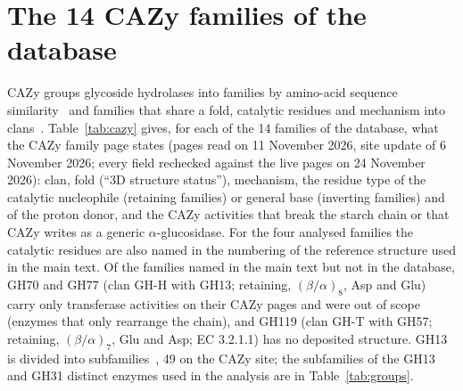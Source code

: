 \documentclass[preprint,12pt]{elsarticle}
\begin{document}
\section{The 14 CAZy families of the database}\label{sec:cazy}
CAZy groups glycoside hydrolases into families by amino-acid sequence similarity~\citep{Henrissat1991,Lombard2014,Drula2022}
and families that share a fold, catalytic residues and mechanism into clans~\citep{Henrissat1996}.
Table~\ref{tab:cazy} gives, for each of the 14 families of the database, what the CAZy family page states (pages
read on 11 November 2026, site update of 6 November 2026; every field rechecked against the live pages on 24
November 2026): clan, fold (``3D structure status''), mechanism, the residue type of the catalytic nucleophile (retaining
families) or general base (inverting families) and of the proton donor, and the CAZy activities that break the
starch chain or that CAZy writes as a generic $\alpha$-glucosidase. For the four analysed families the catalytic
residues are also named in the numbering of the reference structure used in the main text. Of the families named in
the main text but not in the database, GH70 and GH77 (clan GH-H with GH13; retaining, $(\beta/\alpha)_8$, Asp and Glu)
carry only transferase activities on their CAZy pages and were out of scope (enzymes that only rearrange the chain), and
GH119 (clan GH-T with GH57; retaining, $(\beta/\alpha)_7$, Glu and Asp; EC 3.2.1.1) has no deposited structure. GH13
is divided into subfamilies~\citep{Stam2006}, 49 on the CAZy site; the subfamilies of the GH13 and GH31 distinct enzymes
used in the analysis are in Table~\ref{tab:groups}.
\end{document}

